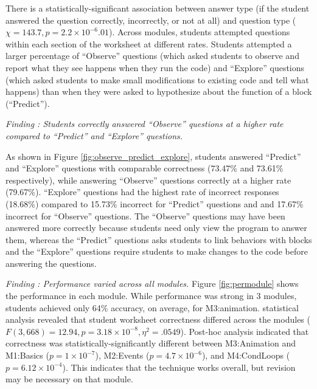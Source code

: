 \documentclass[sigconf,manuscript,review,anonymous]{acmart} %
\begin{document}
There is a statistically-significant association between answer type (if the student answered the question correctly, incorrectly, or not at all) and question type (\begin{math}\chi=143.7, p=2.2\times10^{-6}.01\end{math}). Across modules, students attempted questions within each section of the worksheet at different rates. Students attempted a larger percentage of ``Observe'' questions (which asked students to observe and report what they see happens when they run the code) and ``Explore'' questions (which asked students to make small modifications to existing code and tell what happens) than when they were asked to hypothesize about the function of a block (``Predict''). 

\textit{Finding : Students correctly answered ``Observe'' questions at a higher rate compared to ``Predict'' and ``Explore'' questions.} 

As shown in Figure \ref{fig:observe_predict_explore}, students answered ``Predict'' and ``Explore'' questions with comparable correctness (73.47\% and 73.61\% respectively), while answering ``Observe'' questions correctly at a higher rate (79.67\%). ``Explore'' questions had the highest rate of incorrect responses (18.68\%) compared to 15.73\% incorrect for ``Predict'' questions and and 17.67\% incorrect for ``Observe'' questions. The ``Observe'' questions may have been answered more correctly because students need only view the program to answer them, whereas the ``Predict'' questions asks students to link behaviors with blocks and the ``Explore'' questions require students to make changes to the code before answering the questions.


\textit{Finding : Performance varied across all modules.}
Figure \ref{fig:permodule} shows the performance in each module. While performance was strong in 3 modules, students achieved only 64\% accuracy, on average, for M3:animation. statistical analysis revealed that student worksheet correctness differed across the modules (\begin{math}F(3,668)=12.94, p=3.18\times10^{-8}, \eta^2=.0549\end{math}). Post-hoc analysis indicated that correctness was statistically-significantly different between M3:Animation and M1:Basics (\begin{math}p=1\times10^{-7}\end{math}), M2:Events (\begin{math}p=4.7\times10^{-6}\end{math}), and M4:CondLoops (\begin{math}p=6.12\times10^{-4}\end{math}). This indicates that the technique works overall, but revision may be necessary on that module.
\end{document}
